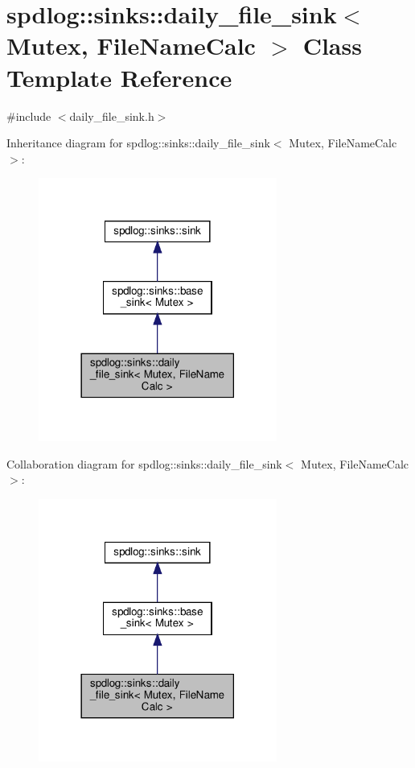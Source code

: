 \hypertarget{classspdlog_1_1sinks_1_1daily__file__sink}{}\section{spdlog\+:\+:sinks\+:\+:daily\+\_\+file\+\_\+sink$<$ Mutex, File\+Name\+Calc $>$ Class Template Reference}
\label{classspdlog_1_1sinks_1_1daily__file__sink}


{\ttfamily \#include $<$daily\+\_\+file\+\_\+sink.\+h$>$}



Inheritance diagram for spdlog\+:\+:sinks\+:\+:daily\+\_\+file\+\_\+sink$<$ Mutex, File\+Name\+Calc $>$\+:
\nopagebreak
\begin{figure}[H]
\begin{center}
\leavevmode
\includegraphics[width=222pt]{classspdlog_1_1sinks_1_1daily__file__sink__inherit__graph}
\end{center}
\end{figure}


Collaboration diagram for spdlog\+:\+:sinks\+:\+:daily\+\_\+file\+\_\+sink$<$ Mutex, File\+Name\+Calc $>$\+:
\nopagebreak
\begin{figure}[H]
\begin{center}
\leavevmode
\includegraphics[width=222pt]{classspdlog_1_1sinks_1_1daily__file__sink__coll__graph}
\end{center}
\end{figure}
